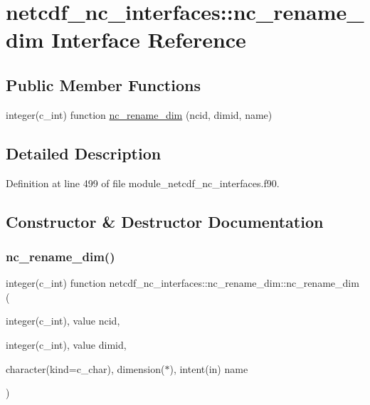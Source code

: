 \hypertarget{interfacenetcdf__nc__interfaces_1_1nc__rename__dim}{}\section{netcdf\+\_\+nc\+\_\+interfaces\+:\+:nc\+\_\+rename\+\_\+dim Interface Reference}
\label{interfacenetcdf__nc__interfaces_1_1nc__rename__dim}
\subsection*{Public Member Functions}
\begin{DoxyCompactItemize}
\item 
integer(c\+\_\+int) function \hyperlink{interfacenetcdf__nc__interfaces_1_1nc__rename__dim_a0de788820da4dedcb3d280ecd23dff61}{nc\+\_\+rename\+\_\+dim} (ncid, dimid, name)
\end{DoxyCompactItemize}


\subsection{Detailed Description}


Definition at line 499 of file module\+\_\+netcdf\+\_\+nc\+\_\+interfaces.\+f90.



\subsection{Constructor \& Destructor Documentation}
\mbox{\label{interfacenetcdf__nc__interfaces_1_1nc__rename__dim_a0de788820da4dedcb3d280ecd23dff61}} 
\subsubsection{\texorpdfstring{nc\+\_\+rename\+\_\+dim()}{nc\_rename\_dim()}}
{\footnotesize\ttfamily integer(c\+\_\+int) function netcdf\+\_\+nc\+\_\+interfaces\+::nc\+\_\+rename\+\_\+dim\+::nc\+\_\+rename\+\_\+dim (\begin{DoxyParamCaption}\item[{integer(c\+\_\+int), value}]{ncid,  }\item[{integer(c\+\_\+int), value}]{dimid,  }\item[{character(kind=c\+\_\+char), dimension($\ast$), intent(in)}]{name }\end{DoxyParamCaption})}



